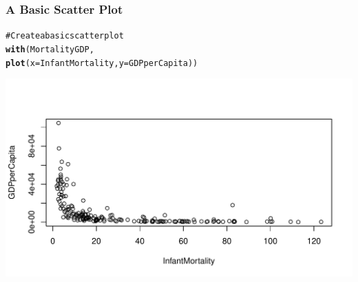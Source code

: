 \documentclass{beamer}\usepackage{graphicx, color}
\makeatletter
\def\maxwidth{ %
  \ifdim\Gin@nat@width>\linewidth
    \linewidth
  \else
    \Gin@nat@width
  \fi
}
\newcommand{\hlfunctioncall}[1]{\textcolor[rgb]{0.501960784313725,0,0.329411764705882}{\textbf{#1}}}%
\newcommand{\hlcomment}[1]{\textcolor[rgb]{0.180392156862745,0.6,0.341176470588235}{#1}}%
\newenvironment{kframe}{%
 \def\at@end@of@kframe{}%
 \ifinner\ifhmode%
  \def\at@end@of@kframe{\end{minipage}}%
  \begin{minipage}{\columnwidth}%
 \fi\fi%
 \def\FrameCommand##1{\hskip\@totalleftmargin \hskip-\fboxsep
 \colorbox{shadecolor}{##1}\hskip-\fboxsep
     \hskip-\linewidth \hskip-\@totalleftmargin \hskip\columnwidth}%
 \MakeFramed {\advance\hsize-\width
   \@totalleftmargin\z@ \linewidth\hsize
   \@setminipage}}%
 {\par\unskip\endMakeFramed%
 \at@end@of@kframe}
\newenvironment{knitrout}{}{} %
\makeatother
\begin{document}
\begin{frame}[fragile]
  \frametitle{A Basic Scatter Plot}
\begin{knitrout}
\color{fgcolor}\begin{kframe}
\begin{alltt}
\hlcomment{# Create a basic scatter plot}
\hlfunctioncall{with}(MortalityGDP,
     \hlfunctioncall{plot}(x = InfantMortality, y = GDPperCapita))
\end{alltt}
\end{kframe}

{\centering \includegraphics[width=\maxwidth]{figure/BasicPlot} 

}


\end{knitrout}

\end{frame}
\end{document}

